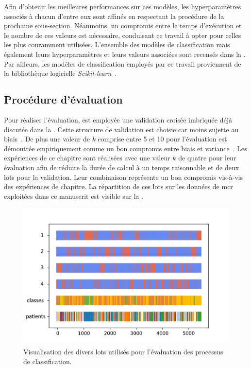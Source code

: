 Afin d'obtenir les meilleures performances sur ces modèles, les hyperparamètres associés à chacun d'entre eux sont affinés en respectant la procédure de la prochaine sous-section. Néanmoins, un compromis entre le temps d'exécution et le nombre de ces valeurs est nécessaire, conduisant ce travail à opter pour celles les plus couramment utilisées. L'ensemble des modèles de classification mais également leurs hyperparamètres et leurs valeurs associées sont recensés dans la . Par ailleurs, les modèles de classification employés par ce travail proviennent de la bibliothèque logicielle \textit{Scikit-learn}~\cite{pedregosa2011}.\par

\subsection{Procédure d'évaluation}
Pour réaliser l'évaluation, est employée une validation croisée imbriquée déjà discutée dans la . Cette structure de validation est choisie car moins sujette au biais~\cite{Cawley2010}. De plus une valeur de $k$ comprise entre 5 et 10 pour l'évaluation est démontrée empiriquement comme un bon compromis entre biais et variance~\cite{James2013}. Les expériences de ce chapitre sont réalisées avec une valeur $k$ de quatre pour leur évaluation afin de réduire la durée de calcul à un temps raisonnable et de deux lots pour la validation. Leur combinaison représente un bon compromis vis-à-vis des expériences de chapitre. La répartition de ces lots sur les données de \gls{mcr} exploitées dans ce manuscrit est visible sur la .\par

\begin{figure}[H]
    \centering
    \includegraphics[width=0.8\linewidth]{contents/chapter_5/resources/visualisation_folds.png}
    \caption{Visualisation des divers lots utilisés pour l'évaluation des processus de classification.}
    \label{fig:visualisation_folds}
\end{figure}\par

